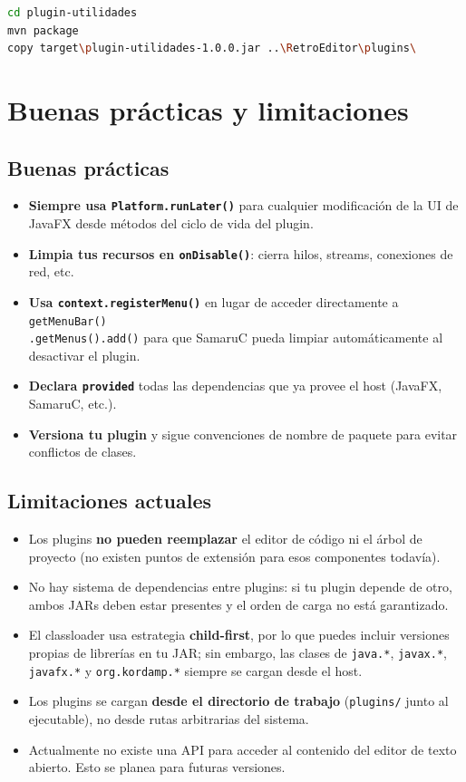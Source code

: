 \documentclass[../../main.tex]{subfiles}
\begin{document}
\begin{lstlisting}[language=bash]
cd plugin-utilidades
mvn package
copy target\plugin-utilidades-1.0.0.jar ..\RetroEditor\plugins\
\end{lstlisting}

\clearpage

\section{Buenas prácticas y limitaciones}

\subsection{Buenas prácticas}

\begin{itemize}
\item \textbf{Siempre usa \texttt{Platform.runLater()}} para cualquier modificación de la UI de JavaFX desde métodos del ciclo de vida del plugin.
\item \textbf{Limpia tus recursos en \texttt{onDisable()}}: cierra hilos, streams, conexiones de red, etc.
\item \textbf{Usa \texttt{context.registerMenu()}} en lugar de acceder directamente a \texttt{getMenuBar() \\ .getMenus().add()} para que SamaruC pueda limpiar automáticamente al desactivar el plugin.
\item \textbf{Declara \texttt{provided}} todas las dependencias que ya provee el host (JavaFX, SamaruC, etc.).
\item \textbf{Versiona tu plugin} y sigue convenciones de nombre de paquete para evitar conflictos de clases.
\end{itemize}

\subsection{Limitaciones actuales}

\begin{itemize}
\item Los plugins \textbf{no pueden reemplazar} el editor de código ni el árbol de proyecto (no existen puntos de extensión para esos componentes todavía).
\item No hay sistema de dependencias entre plugins: si tu plugin depende de otro, ambos JARs deben estar presentes y el orden de carga no está garantizado.
\item El classloader usa estrategia \textbf{child-first}, por lo que puedes incluir versiones propias de librerías en tu JAR; sin embargo, las clases de \texttt{java.*}, \texttt{javax.*}, \texttt{javafx.*} y \texttt{org.kordamp.*} siempre se cargan desde el host.
\item Los plugins se cargan \textbf{desde el directorio de trabajo} (\texttt{plugins/} junto al ejecutable), no desde rutas arbitrarias del sistema.
\item Actualmente no existe una API para acceder al contenido del editor de texto abierto. Esto se planea para futuras versiones.
\end{itemize}

\vspace{2cm}
\begin{center}

\end{center}
\end{document}
